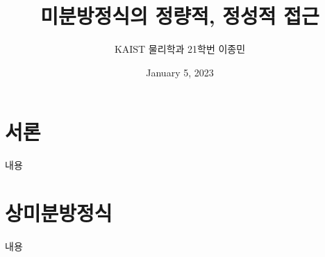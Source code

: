 \documentclass[11pt]{book}
\title{미분방정식의 정량적, 정성적 접근}
\author{KAIST 물리학과 21학번 이종민}
\date{January 5, 2023}
\begin{document}
\section*{서론}
\begin{MLPar}
내용
\end{MLPar}

\section{상미분방정식}
\begin{MLPar}
내용
\end{MLPar}
\end{document}
